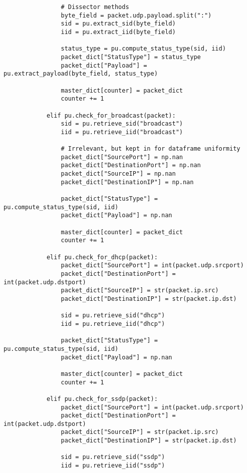 \begin{verbatim}
                # Dissector methods
                byte_field = packet.udp.payload.split(":")
                sid = pu.extract_sid(byte_field)
                iid = pu.extract_iid(byte_field)

                status_type = pu.compute_status_type(sid, iid)
                packet_dict["StatusType"] = status_type
                packet_dict["Payload"] = pu.extract_payload(byte_field, status_type)

                master_dict[counter] = packet_dict
                counter += 1

            elif pu.check_for_broadcast(packet):
                sid = pu.retrieve_sid("broadcast")
                iid = pu.retrieve_iid("broadcast")

                # Irrelevant, but kept in for dataframe uniformity
                packet_dict["SourcePort"] = np.nan
                packet_dict["DestinationPort"] = np.nan
                packet_dict["SourceIP"] = np.nan
                packet_dict["DestinationIP"] = np.nan

                packet_dict["StatusType"] = pu.compute_status_type(sid, iid)
                packet_dict["Payload"] = np.nan

                master_dict[counter] = packet_dict
                counter += 1

            elif pu.check_for_dhcp(packet):
                packet_dict["SourcePort"] = int(packet.udp.srcport)
                packet_dict["DestinationPort"] = int(packet.udp.dstport)
                packet_dict["SourceIP"] = str(packet.ip.src)
                packet_dict["DestinationIP"] = str(packet.ip.dst)

                sid = pu.retrieve_sid("dhcp")
                iid = pu.retrieve_iid("dhcp")

                packet_dict["StatusType"] = pu.compute_status_type(sid, iid)
                packet_dict["Payload"] = np.nan

                master_dict[counter] = packet_dict
                counter += 1

            elif pu.check_for_ssdp(packet):
                packet_dict["SourcePort"] = int(packet.udp.srcport)
                packet_dict["DestinationPort"] = int(packet.udp.dstport)
                packet_dict["SourceIP"] = str(packet.ip.src)
                packet_dict["DestinationIP"] = str(packet.ip.dst)

                sid = pu.retrieve_sid("ssdp")
                iid = pu.retrieve_iid("ssdp")


\end{verbatim}
